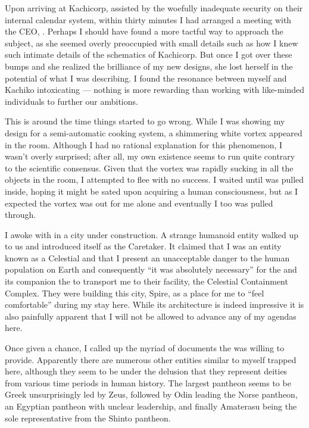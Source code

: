 \documentclass[char]{guardians}
\begin{document}
Upon arriving at Kachicorp, assisted by the woefully inadequate security on their internal calendar system, within thirty minutes I had arranged a meeting with the CEO, \cKachiko{}. Perhaps I should have found a more tactful way to approach the subject, as she seemed overly preoccupied with small details such as how I knew such intimate details of the schematics of Kachicorp. But once I got over these bumps and she realized the brilliance of my new designs, she lost herself in the potential of what I was describing. I found the resonance between myself and Kachiko intoxicating --- nothing is more rewarding than working with like-minded individuals to further our ambitions.

This is around the time things started to go wrong. While I was showing \cKachiko{} my design for a semi-automatic cooking system, a shimmering white vortex appeared in the room. Although I had no rational explanation for this phenomenon, I wasn't overly surprised; after all, my own existence seems to run quite contrary to the scientific consensus. Given that the vortex was rapidly sucking in all the objects in the room, I attempted to flee with no success. I waited until \cKachiko{} was pulled inside, hoping it might be sated upon acquiring a human consciousness, but as I expected the vortex was out for me alone and eventually I too was pulled through.

I awoke with \cKachiko{} in a city under construction. A strange humanoid entity walked up to us and introduced itself as the Caretaker. It claimed that I was an entity known as a Celestial and that I present an unacceptable danger to the human population on Earth and consequently ``it was absolutely necessary'' for the \cCaretaker{} and its companion the \cWarden{} to transport me to their facility, the Celestial Containment Complex. They were building this city, Spire, as a place for me to ``feel comfortable'' during my stay here. While its architecture is indeed impressive it is also painfully apparent that I will not be allowed to advance any of my agendas here.

Once given a chance, I called up the myriad of documents the \cCaretaker{} was willing to provide. Apparently there are numerous other entities similar to myself trapped here, although they seem to be under the delusion that they represent deities from various time periods in human history. The largest pantheon seems to be Greek unsurprisingly led by Zeus, followed by Odin leading the Norse pantheon, an Egyptian pantheon with unclear leadership, and finally Amaterasu being the sole representative from the Shinto pantheon.
\end{document}
